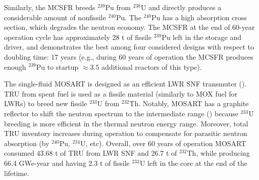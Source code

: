 \documentclass[letterpaper]{mandc2019}
\begin{document}
Similarly, the \gls{MCSFR} breeds $^{239}$Pu from $^{238}$U and directly produces a considerable amount of nonfissile $^{240}$Pu. 
The $^{240}$Pu has a high absorption cross section, which degrades the neutron economy. 
The \gls{MCSFR} at the end of 60-year operation cycle has approximately 28 t of fissile $^{239}$Pu left in the storage and driver, and demonstrates the best among four considered designs with respect to doubling time: 17 years (e.g., during 60 years of operation the \gls{MCSFR} produces enough $^{239}$Pu to startup $\approx3.5$ additional reactors of this type).

The single-fluid \gls{MOSART} is designed as an efficient \gls{LWR} \gls{SNF} transmuter (). 
TRU from spent fuel is used as a fissile material (similarly to \gls{MOX} fuel for \gls{LWR}s) to breed new fissile $^{233}$U from $^{232}$Th. 
Notably, \gls{MOSART} has a graphite reflector to shift the neutron spectrum to the  intermediate range () because $^{233}$U breeding is more efficient in the thermal neutron energy range. 
Moreover, total TRU inventory increases  during operation to compensate for parasitic neutron absorption (by $^{240}$Pu, $^{234}$U, etc). 
Overall, over 60 years of operation \gls{MOSART} consumed 43.68 t of TRU from \gls{LWR} \gls{SNF} and 26.7 t of $^{232}$Th, while producing 66.4 GWe-year and having 2.3 t of fissile $^{233}$U left in the core at the end of the lifetime.
\end{document}
